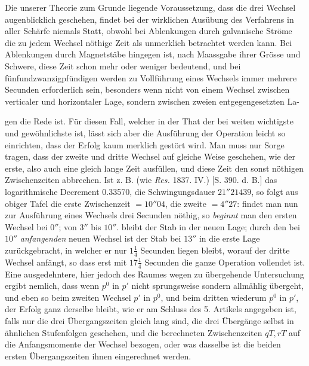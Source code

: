 Die unserer Theorie zum Grunde liegende Voraussetzung, dass die drei Wechsel augenblicklich geschehen, findet bei der wirklichen Ausübung des Verfahrens in aller Schärfe niemals Statt, obwohl bei Ablenkungen durch galvanische Ströme die zu jedem Wechsel nöthige Zeit als unmerklich betrachtet werden kann. Bei Ablenkungen durch Magnetstäbe hingegen ist, nach Maassgabe ihrer Grösse und Schwere, diese Zeit schon mehr oder weniger bedeutend, und bei fünfundzwanzigpfündigen werden zu Vollführung eines Wechsels immer mehrere Secunden erforderlich sein, besonders wenn nicht von einem Wechsel zwischen verticaler und horizontaler Lage, sondern zwischen zweien entgegengesetzten La-
\par\clearpage
{}
\noindent gen die Rede ist. Für diesen Fall, welcher in der That der bei weiten wichtigste und gewöhnlichste ist, lässt sich aber die Ausführung der Operation leicht so einrichten, dass der Erfolg kaum merklich gestört wird. Man muss nur Sorge tragen, dass der zweite und dritte Wechsel auf gleiche Weise geschehen, wie der erste, also auch eine gleich lange Zeit ausfüllen, und diese Zeit den sonst nöthigen Zwischenzeiten abbrechen. Ist z. B. (wie \textit{Res.} 1837. IV.) [S. 390. d. B.] das logarithmische Decrement 0.33570, die Schwingungsdauer $21''21439$, so folgt aus obiger Tafel die erste Zwischenzeit $=10''04$, die zweite $=4''27$: findet man nun zur Ausführung eines Wechsels drei Secunden nöthig, so \textit{beginnt} man den ersten Wechsel bei $0''$; von $3''$ bis $10''$. bleibt der Stab in der neuen Lage; durch den bei $10''$ \textit{anfangenden} neuen Wechsel ist der Stab bei $13''$ in die erste Lage zurückgebracht, in welcher er nur $1\tfrac{1}{4}$ Secunden liegen bleibt, worauf der dritte Wechsel anfängt, so dass erst mit $17\tfrac{1}{4}$ Secunden die ganze Operation vollendet ist. Eine ausgedehntere, hier jedoch des Raumes wegen zu übergehende Untersuchung ergibt nemlich, dass wenn $p^0$ in $p'$ nicht sprungsweise sondern allmählig übergeht, und eben so beim zweiten Wechsel $p'$ in $p^0$, und beim dritten wiederum $p^0$ in $p'$, der Erfolg ganz derselbe bleibt, wie er am Schluss des 5. Artikels angegeben ist, falls nur die drei Übergangszeiten gleich lang sind, die drei Übergänge selbst in ähnlichen Stufenfolgen geschehen, und die berechneten Zwischenzeiten $qT,rT$ auf die Anfangsmomente der Wechsel bezogen, oder was dasselbe ist die beiden ersten Übergangszeiten ihnen eingerechnet werden.

